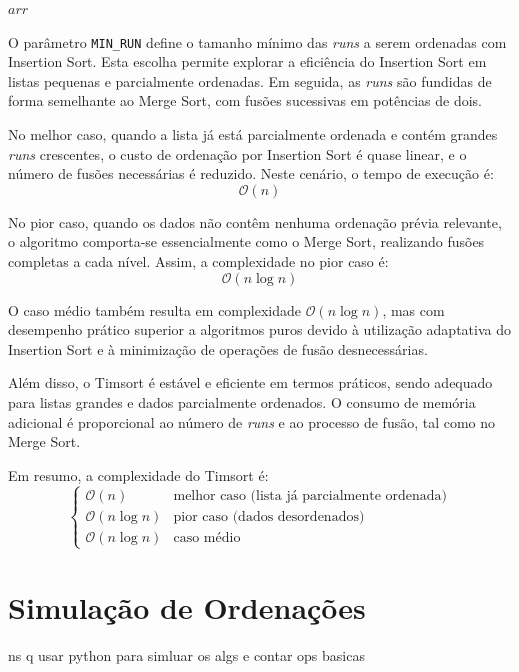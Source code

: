 \documentclass[conference]{IEEEtran}
\begin{document}
\begin{algorithm}[H]
\begin{algorithmic}[1]
            \State \Return $arr$
        \EndFunction
    
        \State {}
    \end{algorithmic}
\end{algorithm}

O parâmetro \texttt{MIN\_RUN} define o tamanho mínimo das \textit{runs} a serem ordenadas com Insertion Sort. Esta escolha permite explorar a eficiência do Insertion Sort em listas pequenas e parcialmente ordenadas. Em seguida, as \textit{runs} são fundidas de forma semelhante ao Merge Sort, com fusões sucessivas em potências de dois.

No melhor caso, quando a lista já está parcialmente ordenada e contém grandes \textit{runs} crescentes, o custo de ordenação por Insertion Sort é quase linear, e o número de fusões necessárias é reduzido. Neste cenário, o tempo de execução é:
\[
\mathcal{O}(n)
\]

No pior caso, quando os dados não contêm nenhuma ordenação prévia relevante, o algoritmo comporta-se essencialmente como o Merge Sort, realizando fusões completas a cada nível. Assim, a complexidade no pior caso é:
\[
\mathcal{O}(n \log n)
\]

O caso médio também resulta em complexidade \(\mathcal{O}(n \log n)\), mas com desempenho prático superior a algoritmos puros devido à utilização adaptativa do Insertion Sort e à minimização de operações de fusão desnecessárias.

Além disso, o Timsort é estável e eficiente em termos práticos, sendo adequado para listas grandes e dados parcialmente ordenados. O consumo de memória adicional é proporcional ao número de \textit{runs} e ao processo de fusão, tal como no Merge Sort.

Em resumo, a complexidade do Timsort é:
\[
\begin{cases}
\mathcal{O}(n) & \text{melhor caso (lista já parcialmente ordenada)} \\
\mathcal{O}(n \log n) & \text{pior caso (dados desordenados)} \\
\mathcal{O}(n \log n) & \text{caso médio}
\end{cases}
\]

\section{Simulação de Ordenações}

ns q usar python para simluar os algs e contar ops basicas
\end{document}
